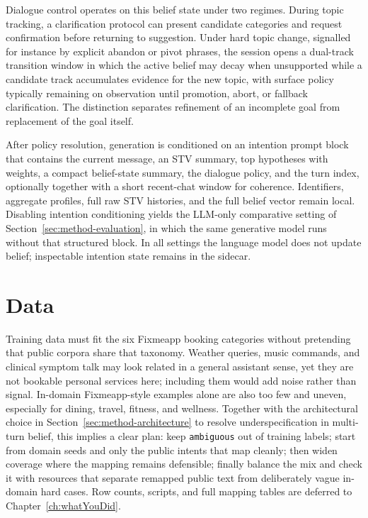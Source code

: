 Dialogue control operates on this belief state under two regimes.
During topic tracking, a clarification protocol can present candidate categories and request confirmation before returning to suggestion.
Under hard topic change, signalled for instance by explicit abandon or pivot phrases, the session opens a dual-track transition window in which the active belief may decay when unsupported while a candidate track accumulates evidence for the new topic, with surface policy typically remaining on observation until promotion, abort, or fallback clarification.
The distinction separates refinement of an incomplete goal from replacement of the goal itself.

After policy resolution, generation is conditioned on an intention prompt block that contains the current message, an STV summary, top hypotheses with weights, a compact belief-state summary, the dialogue policy, and the turn index, optionally together with a short recent-chat window for coherence.
Identifiers, aggregate profiles, full raw STV histories, and the full belief vector remain local.
Disabling intention conditioning yields the LLM-only comparative setting of Section~\ref{sec:method-evaluation}, in which the same generative model runs without that structured block.
In all settings the language model does not update belief; inspectable intention state remains in the sidecar.

\section{Data}
\label{sec:method-data}

Training data must fit the six Fixmeapp booking categories without pretending that public corpora share that taxonomy.
Weather queries, music commands, and clinical symptom talk may look related in a general assistant sense, yet they are not bookable personal services here; including them would add noise rather than signal.
In-domain Fixmeapp-style examples alone are also too few and uneven, especially for dining, travel, fitness, and wellness.
Together with the architectural choice in Section~\ref{sec:method-architecture} to resolve underspecification in multi-turn belief, this implies a clear plan: keep \texttt{ambiguous} out of training labels; start from domain seeds and only the public intents that map cleanly; then widen coverage where the mapping remains defensible; finally balance the mix and check it with resources that separate remapped public text from deliberately vague in-domain hard cases.
Row counts, scripts, and full mapping tables are deferred to Chapter~\ref{ch:whatYouDid}.

